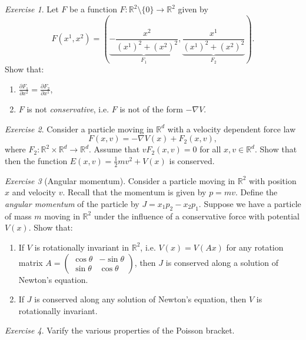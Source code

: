 \documentclass[12pt]{amsart}
\numberwithin{equation}{section}
\theoremstyle{plain}
\theoremstyle{definition}
\theoremstyle{remark}
\newtheorem{exe}{Exercise}[subsection]
\newcommand{\R}{\mathbb{R}}
\begin{document}
\begin{exe}
Let $F$ be a function $F\colon \R^2\setminus\{0\}\to \R^2$ given by $$F(x^1,x^2)=\left(\underbrace{-\frac{x^2}{(x^1)^2+(x^2)^2}}_{F_1},\underbrace{\frac{x^1}{(x^1)^2+(x^2)^2}}_{F_2}\right).$$
Show that: 
\begin{enumerate}
\item{$\frac{\partial F_1}{\partial x^2}=\frac{\partial F_2}{\partial x^1}$,
}
\item{$F$ is not \emph{conservative}, i.e. $F$ is not of the form $-\nabla V$.}
\end{enumerate}
\end{exe}

\begin{exe}
Consider a particle moving in $\R^d$ with a velocity dependent force law $$F(x,v)=-\nabla V(x)+F_2(x,v),$$ where $F_2\colon\R^2\times\R^d\to\R^d$. Assume that $vF_2(x,v)=0$ for all $x,v\in\R^d$. Show that then the function $E(x,v)=\frac{1}{2}mv^2+V(x)$ is conserved.
\end{exe}

\begin{exe}[Angular momentum]
Consider a particle moving in $\R^2$ with position $x$ and velocity $v$. Recall that the momentum is given by $p=mv$. Define the \emph{angular momentum} of the particle by $J=x_1p_2-x_2p_1$. Suppose we have a particle of mass $m$ moving in $\R^2$ under the influence of a conservative force with potential $V(x)$. Show that:
\begin{enumerate}
\item{If $V$ is rotationally invariant in $\R^2$, i.e. $V(x)=V(Ax)$ for any rotation matrix $A=\begin{pmatrix}\cos\theta&-\sin\theta\\ \sin\theta&\cos\theta\end{pmatrix}$, then $J$ is conserved along a solution of Newton's equation.
}
\item{If $J$ is conserved along any solution of Newton's equation, then $V$ is rotationally invariant.
}
\end{enumerate}
\end{exe}

\begin{exe}
Varify the various properties of the Poisson bracket.
\end{exe}
\end{document}
